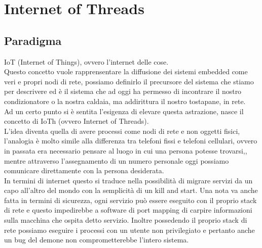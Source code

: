 \documentclass[14pt,a4paper,openright,twoside]{extreport}
\begin{document}
\clearpage{\pagestyle{empty}\cleardoublepage}
\tableofcontents                        %
\rhead[\fancyplain{}{\bfseries\leftmark}]{\fancyplain{}{\bfseries\thepage}}
\clearpage{\pagestyle{empty}\cleardoublepage}
\listoffigures                          %
\clearpage{\pagestyle{empty}\cleardoublepage}
\listoftables                           %
\clearpage{\pagestyle{empty}\cleardoublepage}
\chapter{Internet of Threads}                %
\lhead[\fancyplain{}{\bfseries\thepage}]{\fancyplain{}{\bfseries\rightmark}}
\section{Paradigma}                 %
IoT (Internet of Things), ovvero l'internet delle cose.\\
Questo concetto vuole rapprensentare la diffusione dei sistemi embedded come veri e propri nodi di rete, possiamo definirlo il precursore del sistema che stiamo per descrivere ed \`e il sistema che ad oggi ha permesso di incontrare il nostro condizionatore o la nostra caldaia, ma addirittura il nostro tostapane, in rete.\\
Ad un certo punto si \`e sentita l'esigenza di elevare questa astrazione, nasce il concetto di IoTh (ovvero Internet of Threads).\\
L'idea diventa quella di avere processi come nodi di rete e non oggetti fisici, l'analogia \`e molto simile alla differenza tra telefoni fissi e telefoni cellulari, ovvero in passata era necessario pensare al luogo in cui una persona potesse trovarsi,, mentre attraverso l'assegnamento di un numero personale oggi possiamo comunicare direttamente con la persona desiderata\cite{K1,K2}.\\
In termini di internet questo si traduce nella possibilit\`a di migrare servizi da un capo all'altro del mondo con la semplicit\`a di un kill and start.
Una nota va anche fatta in termini di sicurezza, ogni servizio pu\`o essere eseguito con il proprio stack di rete e questo impedirebbe a software di port mapping di carpire informazioni sulla macchina che ospita detto servizio. Inoltre possedendo il proprio stack di rete possiamo eseguire i processi con un utente non privilegiato e pertanto anche un bug del demone non comprometterebbe l'intero sistema.
\end{document}
